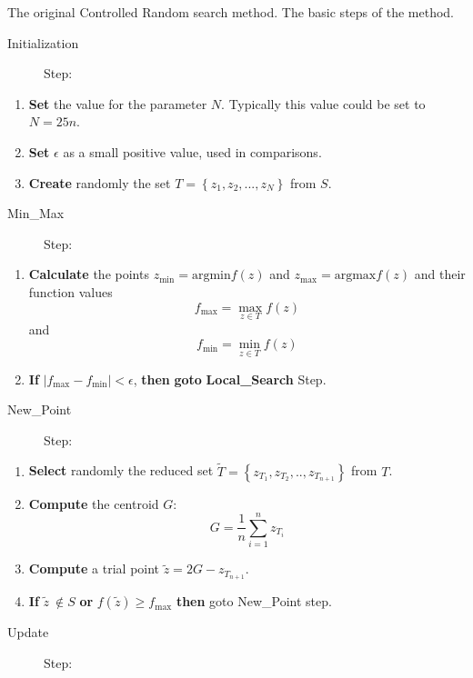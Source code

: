 \documentclass[symmetry,article,submit,moreauthors,pdftex]{mdpi}
\begin{document}
\begin{algorithm}
\caption{The original Controlled Random search method. The basic steps of the method.\label{alg:The-Controlled-Random}}

\begin{description}
\item [{Initialization}] Step:
\end{description}
\begin{enumerate}
\item \textbf{Set} the value for the parameter $N$. Typically this value could be set to  $N=25n$.
\item \textbf{Set}  $\epsilon$ as a small positive value, used in comparisons.
\item \textbf{Create} randomly  the set $T=\left\{ z_{1},z_{2},...,z_{N}\right\} $ from $S$.
\end{enumerate}
\begin{description}
\item [{Min\_Max}] Step:
\end{description}
\begin{enumerate}
\item \textbf{Calculate} the points $z_{\mbox{min}}=\mbox{argmin}f(z)$
and $z_{\mbox{max}}=\mbox{argmax}f(z)$ and their function values
\[
f_{\mbox{max}}=\max_{z\in T}f(z)
\]
 and 
\[
f_{\mbox{min}}=\min_{z\in T}f(z)
\]
\item \textbf{If} $\left|f_{\mbox{max}}-f_{\mbox{min}}\right|<\epsilon$,
\textbf{then} \textbf{goto} \textbf{Local\_Search} Step.
\end{enumerate}
\begin{description}
\item [{New\_Point}] Step:
\end{description}
\begin{enumerate}
\item \textbf{Select} randomly the reduced set $\tilde{T}=\left\{ z_{T_{1}},z_{T_{2}},..,z_{T_{n+1}}\right\} $
from $T$.
\item \textbf{Compute} the centroid $G$: 
\[
G=\frac{1}{n}\sum_{i=1}^{n}z_{T_{i}}
\]
\item \textbf{Compute} a trial point $\tilde{z}=2G-z_{T_{n+1}}$.
\item \textbf{If} $\tilde{z}\ \notin S$ \textbf{or} $f(\tilde{z})\ge f_{\mbox{max}}$
\textbf{then} goto New\_Point step. 
\end{enumerate}
\begin{description}
\item [{Update}] Step:

\end{description}
\end{algorithm}
\end{document}
